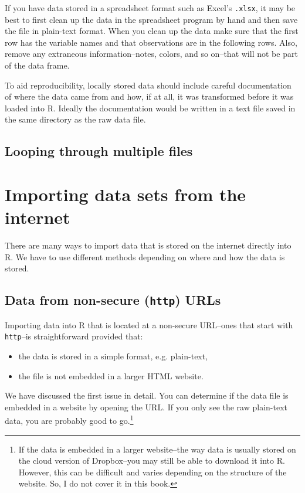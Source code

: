 If you have data stored in a spreadsheet format such as Excel's \texttt{.xlsx}, it may be best to first clean up the data in the spreadsheet program by hand and then save the file in plain-text format. When you clean up the data make sure that the first row has the variable names and that observations are in the following rows. Also, remove any extraneous information--notes, colors, and so on--that will not be part of the data frame.

To aid reproducibility, locally stored data should include careful documentation of where the data came from and how, if at all, it was transformed before it was loaded into R. Ideally the documentation would be written in a text file saved in the same directory as the raw data file. 

\subsection{Looping through multiple files}


\section{Importing data sets from the internet}

There are many ways to import data that is stored on the internet directly into R. We have to use different methods depending on where and how the data is stored. 

\subsection{Data from non-secure ({\tt{http}}) URLs}

Importing data into R that is located at a non-secure URL--ones that start with {\tt{http}}--is straightforward provided that:

\begin{itemize}
	\item the data is stored in a simple format, e.g. plain-text,
	\item the file is not embedded in a larger HTML website.
\end{itemize}

We have discussed the first issue in detail. You can determine if the data file is embedded in a website by opening the URL. If you only see the raw plain-text data, you are probably good to go.\footnote{If the data is embedded in a larger website--the way data is usually stored on the cloud version of Dropbox--you may still be able to download it into R. However, this can be difficult and varies depending on the structure of the website. So, I do not cover it in this book.}

